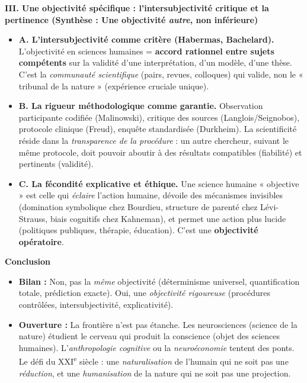 \documentclass[11pt]{article}
\begin{document}
\begin{exoresolu}
\textbf{III. Une objectivité spécifique : l'intersubjectivité critique et la pertinence (Synthèse : Une objectivité \emph{autre}, non inférieure)}
\begin{itemize}
    \item \textbf{A. L'intersubjectivité comme critère (Habermas, Bachelard).} L'objectivité en sciences humaines = \textbf{accord rationnel entre sujets compétents} sur la validité d'une interprétation, d'un modèle, d'une thèse. C'est la \emph{communauté scientifique} (pairs, revues, colloques) qui valide, non le « tribunal de la nature » (expérience cruciale unique).
    \item \textbf{B. La rigueur méthodologique comme garantie.} Observation participante codifiée (Malinowski), critique des sources (Langlois/Seignobos), protocole clinique (Freud), enquête standardisée (Durkheim). La scientificité réside dans la \emph{transparence de la procédure} : un autre chercheur, suivant le même protocole, doit pouvoir aboutir à des résultats compatibles (fiabilité) et pertinents (validité).
    \item \textbf{C. La fécondité explicative et éthique.} Une science humaine « objective » est celle qui \emph{éclaire} l'action humaine, dévoile des mécanismes invisibles (domination symbolique chez Bourdieu, structure de parenté chez Lévi-Strauss, biais cognitifs chez Kahneman), et permet une action plus lucide (politiques publiques, thérapie, éducation). C'est une \textbf{objectivité opératoire}.
\end{itemize}

\textbf{Conclusion}
\begin{itemize}
    \item \textbf{Bilan :} Non, pas la \emph{même} objectivité (déterminisme universel, quantification totale, prédiction exacte). Oui, une \emph{objectivité rigoureuse} (procédures contrôlées, intersubjectivité, explicativité).
    \item \textbf{Ouverture :} La frontière n'est pas étanche. Les neurosciences (science de la nature) étudient le cerveau qui produit la conscience (objet des sciences humaines). L'\emph{anthropologie cognitive} ou la \emph{neuroéconomie} tentent des ponts. Le défi du XXI\textsuperscript{e} siècle : une \emph{naturalisation} de l'humain qui ne soit pas une \emph{réduction}, et une \emph{humanisation} de la nature qui ne soit pas une projection.
\end{itemize}
\end{exoresolu}
\end{document}

